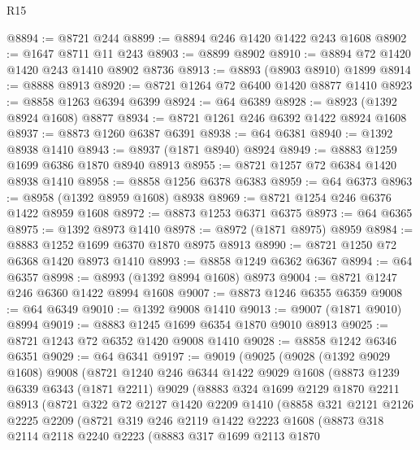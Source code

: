 \begin{lexlean}{R15}
\begin{coremodule}
@8894 := @8721 @244
@8899 := @8894 @246 @1420 @1422 @243 @1608
@8902 := @1647 @8711 @11 @243
@8903 := @8899 @8902
@8910 := @8894 @72 @1420 @1420 @243 @1410 @8902 @8736
@8913 := @8893 (@8903 @8910) @1899
@8914 := @8888 @8913
@8920 := @8721 @1264 @72 @6400 @1420 @8877 @1410
@8923 := @8858 @1263 @6394 @6399
@8924 := @64 @6389
@8928 := @8923 (@1392 @8924 @1608) @8877
@8934 := @8721 @1261 @246 @6392 @1422 @8924 @1608
@8937 := @8873 @1260 @6387 @6391
@8938 := @64 @6381
@8940 := @1392 @8938 @1410
@8943 := @8937 (@1871 @8940) @8924
@8949 := @8883 @1259 @1699 @6386 @1870 @8940 @8913
@8955 := @8721 @1257 @72 @6384 @1420 @8938 @1410
@8958 := @8858 @1256 @6378 @6383
@8959 := @64 @6373
@8963 := @8958 (@1392 @8959 @1608) @8938
@8969 := @8721 @1254 @246 @6376 @1422 @8959 @1608
@8972 := @8873 @1253 @6371 @6375
@8973 := @64 @6365
@8975 := @1392 @8973 @1410
@8978 := @8972 (@1871 @8975) @8959
@8984 := @8883 @1252 @1699 @6370 @1870 @8975 @8913
@8990 := @8721 @1250 @72 @6368 @1420 @8973 @1410
@8993 := @8858 @1249 @6362 @6367
@8994 := @64 @6357
@8998 := @8993 (@1392 @8994 @1608) @8973
@9004 := @8721 @1247 @246 @6360 @1422 @8994 @1608
@9007 := @8873 @1246 @6355 @6359
@9008 := @64 @6349
@9010 := @1392 @9008 @1410
@9013 := @9007 (@1871 @9010) @8994
@9019 := @8883 @1245 @1699 @6354 @1870 @9010 @8913
@9025 := @8721 @1243 @72 @6352 @1420 @9008 @1410
@9028 := @8858 @1242 @6346 @6351
@9029 := @64 @6341
@9197 := @9019
    (@9025
      (@9028
        (@1392 @9029 @1608)
        @9008
        (@8721
          @1240
          @246
          @6344
          @1422
          @9029
          @1608
          (@8873
            @1239
            @6339
            @6343
            (@1871 @2211)
            @9029
            (@8883
              @324
              @1699
              @2129
              @1870
              @2211
              @8913
              (@8721
                @322
                @72
                @2127
                @1420
                @2209
                @1410
                (@8858
                  @321
                  @2121
                  @2126
                  @2225
                  @2209
                  (@8721
                    @319
                    @246
                    @2119
                    @1422
                    @2223
                    @1608
                    (@8873
                      @318
                      @2114
                      @2118
                      @2240
                      @2223
                      (@8883
                        @317
                        @1699
                        @2113
                        @1870

\end{coremodule}
\end{lexlean}
